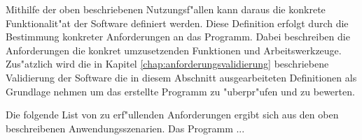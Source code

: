 Mithilfe der oben beschriebenen Nutzungsf"allen kann daraus die konkrete Funktionalit"at der Software definiert werden.
Diese Definition erfolgt durch die Bestimmung konkreter Anforderungen an das Programm.
Dabei beschreiben die Anforderungen die konkret umzusetzenden Funktionen und Arbeitswerkzeuge.
Zus"atzlich wird die in Kapitel \ref{chap:anforderungsvalidierung} beschriebene Validierung der Software die in diesem Abschnitt ausgearbeiteten Definitionen als Grundlage nehmen um das erstellte Programm zu "uberpr"ufen und zu bewerten.

Die folgende List von zu erf"ullenden Anforderungen ergibt sich aus den oben beschreibenen Anwendungsszenarien.
Das Programm ...
\renewcommand{\theenumi}{\Alph{enumi}}
\renewcommand{\labelenumi}{\theenumi )}
\newcommand{\AF}[1]{\item \label{AF:#1}}
